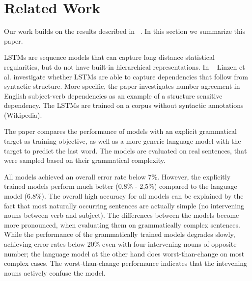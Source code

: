 \section{Related Work}
\label{related work}


Our work builds on the results described in ~\citep{Linzen2016}. In this section 
we summarize this paper. 

LSTMs are sequence models that can capture long distance statistical regularities,
but do not have built-in hierarchical representations.
In ~\citep{Linzen2016} Linzen et al. investigate whether LSTMs are able to capture
dependencies that follow from syntactic structure. More specific,
the paper investigates number agreement in English subject-verb dependencies
as an example of a structure sensitive dependency.
The LSTMs are trained on a corpus without syntactic annotations (Wikipedia).



The paper compares the performance of models
with an explicit grammatical target as training objective,
as well as a more generic language model with the target to
predict the last word. 
The models are evaluated on real sentences, 
that were sampled based on their grammatical complexity. 


  
All models achieved an overall error rate below 7\%. However,
the explicitly trained models perform much better (0.8\% - 2,5\%)
compared to the language model (6.8\%). 
The overall high accuracy for all models can be explained by
the fact that most naturally occurring sentences are actually
simple (no intervening nouns between verb and subject).
The differences between the models become more pronounced,
when evaluating them on grammatically complex sentences.
While the performance of the grammatically trained models
degrades slowly, achieving error rates below 20\% even with
four intervening nouns of opposite number;
the language model at the other hand does worst-than-change
on most complex cases. The worst-than-change performance
indicates that the intevening nouns actively confuse
the model. 

